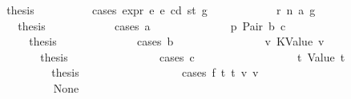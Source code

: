 \begin{isabellebody}
\ \ \ \ \ \ \ \ \isamarkupfalse%
\ \isamarkupfalse%
\ {\isacharquery}{\kern0pt}thesis\isanewline
\ \ \ \ \ \ \ \ \isamarkupfalse%
\ {\isacharparenleft}{\kern0pt}cases\ {\isachardoublequoteopen}expr\ e{}\ e\ cd\ st\ g{}{\isacharprime}{\kern0pt}{\isachardoublequoteclose}{\isacharparenright}{\kern0pt}\isanewline
\ \ \ \ \ \ \ \ \ \ \isamarkupfalse%
\ r{}{\isacharcolon}{\kern0pt}\ {\isacharparenleft}{\kern0pt}n\ a{\isacharprime}{\kern0pt}\ g{}{\isacharprime}{\kern0pt}{\isacharprime}{\kern0pt}{\isacharparenright}{\kern0pt}\isanewline
\ \ \ \ \ \ \ \ \ \ \isamarkupfalse%
\ \isamarkupfalse%
\ {\isacharquery}{\kern0pt}thesis\isanewline
\ \ \ \ \ \ \ \ \ \ \isamarkupfalse%
\ {\isacharparenleft}{\kern0pt}cases\ a{\isacharprime}{\kern0pt}{\isacharparenright}{\kern0pt}\isanewline
\ \ \ \ \ \ \ \ \ \ \ \ \isamarkupfalse%
\ p{}{\isacharcolon}{\kern0pt}\ {\isacharparenleft}{\kern0pt}Pair\ b\ c{\isacharparenright}{\kern0pt}\isanewline
\ \ \ \ \ \ \ \ \ \ \ \ \isamarkupfalse%
\ \isamarkupfalse%
\ {\isacharquery}{\kern0pt}thesis\isanewline
\ \ \ \ \ \ \ \ \ \ \ \ \isamarkupfalse%
\ {\isacharparenleft}{\kern0pt}cases\ b{\isacharparenright}{\kern0pt}\isanewline
\ \ \ \ \ \ \ \ \ \ \ \ \ \ \isamarkupfalse%
\ v{}{\isacharcolon}{\kern0pt}\ {\isacharparenleft}{\kern0pt}KValue\ v{}{\isacharparenright}{\kern0pt}\isanewline
\ \ \ \ \ \ \ \ \ \ \ \ \ \ \isamarkupfalse%
\ \isamarkupfalse%
\ {\isacharquery}{\kern0pt}thesis\isanewline
\ \ \ \ \ \ \ \ \ \ \ \ \ \ \isamarkupfalse%
\ {\isacharparenleft}{\kern0pt}cases\ c{\isacharparenright}{\kern0pt}\isanewline
\ \ \ \ \ \ \ \ \ \ \ \ \ \ \ \ \isamarkupfalse%
\ t{}{\isacharcolon}{\kern0pt}\ {\isacharparenleft}{\kern0pt}Value\ t{}{\isacharparenright}{\kern0pt}\isanewline
\ \ \ \ \ \ \ \ \ \ \ \ \ \ \ \ \isamarkupfalse%
\ \isamarkupfalse%
\ {\isacharquery}{\kern0pt}thesis\isanewline
\ \ \ \ \ \ \ \ \ \ \ \ \ \ \ \ \isamarkupfalse%
\ {\isacharparenleft}{\kern0pt}cases\ {\isachardoublequoteopen}f\ t{}\ t{}\ v{}\ v{}{\isachardoublequoteclose}{\isacharparenright}{\kern0pt}\isanewline
\ \ \ \ \ \ \ \ \ \ \ \ \ \ \ \ \ \ \isamarkupfalse%
\ None\isanewline

\end{isabellebody}
